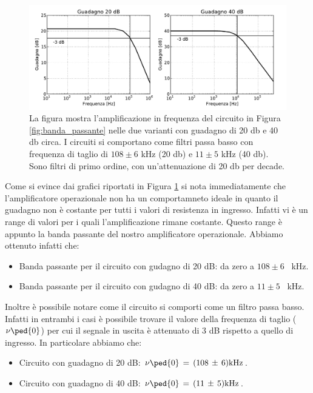 \begin{figure}[H]
    \includegraphics[width=\textwidth]{Figure/freq_ris.pdf}
    \caption{La figura mostra l'amplificazione in frequenza del circuito in Figura \ref{fig:banda_passante} nelle due varianti con guadagno di 20 db e 40 db circa. I circuiti si comportano come filtri passa basso con frequenza di taglio di $108 \pm 6$ kHz (20 db) e $11 \pm 5$ kHz (40 db). Sono filtri di primo ordine, con un'attenuazione di 20 db per decade.}
    \label{fig:DB_plot}
\end{figure}

Come si evince dai grafici riportati in Figura \ref{fig:DB_plot} si nota immediatamente che l'amplificatore operazionale non ha un comportamneto ideale in quanto il guadagno non è costante per tutti i valori di resistenza in ingresso. Infatti vi è un range di valori per i quali l'amplificazione rimane costante. Questo range è appunto la banda passante del nostro amplificatore operazionale. Abbiamo ottenuto infatti che:
\begin{itemize}\itemsep2pt \parskip0pt 
    \item{Banda passante per il circuito con gudagno di 20 dB: da zero a $108 \pm 6$ \SI{}{\kilo\hertz}.}
    \item{Banda passante per il circuito con gudagno di 40 dB: da zero a $11 \pm 5$ \SI{}{\kilo\hertz}.}
\end{itemize}
Inoltre è possibile notare come il circuito si comporti come un filtro passa basso. Infatti in entrambi i casi è possibile trovare il valore della frequenza di taglio ($\nu\ped{0}$) per cui il segnale in uscita è attenuato di 3 dB rispetto a quello di ingresso. In particolare abbiamo che:
\begin{itemize}\itemsep2pt \parskip0pt 
    \item{Circuito con guadagno di 20 dB: $\nu\ped{0}\,=\,(108\,\pm\,6)\SI{}{\kilo\hertz}$.}
    \item{Circuito con guadagno di 40 dB: $\nu\ped{0}\,=\,(11\,\pm\,5)\SI{}{\kilo\hertz}$.}
\end{itemize}

